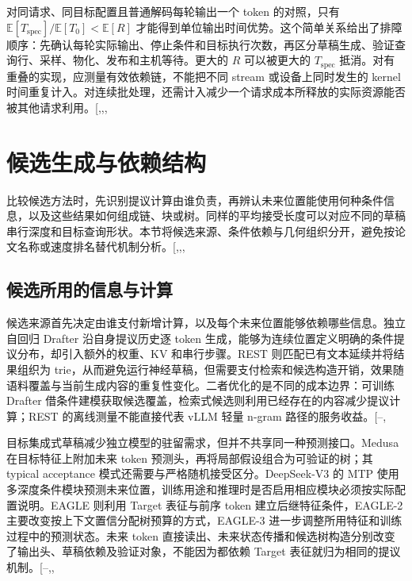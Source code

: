 \documentclass[
  a4paper,
  UTF8,
  fontset=none,
  zihao=5]{ctexart}
\begin{document}
对同请求、同目标配置且普通解码每轮输出一个 token 的对照，只有
\(\mathbb E[T_{\mathrm{spec}}]/\mathbb E[T_0]<\mathbb E[R]\)
才能得到单位输出时间优势。这个简单关系给出了排障顺序：先确认每轮实际输出、停止条件和目标执行次数，再区分草稿生成、验证查询行、采样、物化、发布和主机等待。更大的
\(R\) 可以被更大的 \(T_{\mathrm{spec}}\)
抵消。对有重叠的实现，应测量有效依赖链，不能把不同 stream
或设备上同时发生的 kernel
时间重复计入。对连续批处理，还需计入减少一个请求成本所释放的实际资源能否被其他请求利用。{[},,,\citeproc{ref-forespark}{14}{]}

\section{候选生成与依赖结构}\label{drafting}

比较候选方法时，先识别提议计算由谁负责，再辨认未来位置能使用何种条件信息，以及这些结果如何组成链、块或树。同样的平均接受长度可以对应不同的草稿串行深度和目标查询形状。本节将候选来源、条件依赖与几何组织分开，避免按论文名称或速度排名替代机制分析。{[},,,\citeproc{ref-rest}{36}{]}

\subsection{候选所用的信息与计算}\label{draft-sources}

候选来源首先决定由谁支付新增计算，以及每个未来位置能够依赖哪些信息。独立自回归
Drafter 沿自身提议历史逐 token
生成，能够为连续位置定义明确的条件提议分布，却引入额外的权重、KV
和串行步骤。REST 则匹配已有文本延续并将结果组织为
trie，从而避免运行神经草稿，但需要支付检索和候选构造开销，效果随语料覆盖与当前生成内容的重复性变化。二者优化的是不同的成本边界：可训练
Drafter
借条件建模获取候选覆盖，检索式候选则利用已经存在的内容减少提议计算；REST
的离线测量不能直接代表 vLLM 轻量 n-gram
路径的服务收益。{[}--,\citeproc{ref-rest}{36}{]}

目标集成式草稿减少独立模型的驻留需求，但并不共享同一种预测接口。Medusa
在目标特征上附加未来 token 预测头，再将局部假设组合为可验证的树；其
typical acceptance 模式还需要与严格随机接受区分。DeepSeek-V3 的 MTP
使用多深度条件模块预测未来位置，训练用途和推理时是否启用相应模块必须按实际配置说明。EAGLE
则利用 Target 表征与前序 token 建立后继特征条件，EAGLE-2
主要改变按上下文置信分配树预算的方式，EAGLE-3
进一步调整所用特征和训练过程中的预测状态。未来 token
直接读出、未来状态传播和候选树构造分别改变了输出头、草稿依赖及验证对象，不能因为都依赖
Target
表征就归为相同的提议机制。{[}--,,\citeproc{ref-eagle2}{38}{]}
\end{document}
